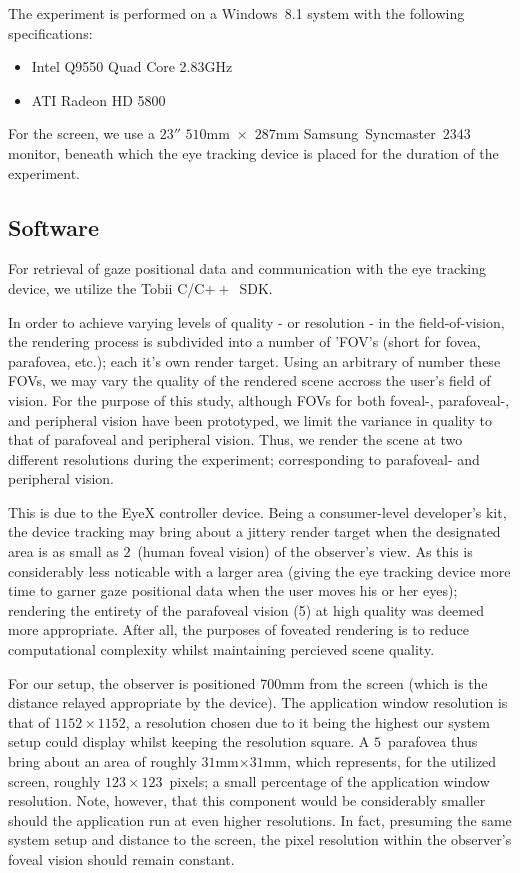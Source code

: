 The experiment is performed on a Windows~8.1 system with the following specifications:
\begin{itemize}
\setlength\itemsep{0em}
\item Intel Q9550 Quad Core 2.83GHz
\item ATI Radeon HD 5800
\end{itemize}

For the screen, we use a $23''$ $510$mm~$\times$~$287$mm Samsung~Syncmaster~$2343$ monitor, beneath which the eye tracking device is placed for the duration of the experiment.

\subsection{Software}
For retrieval of gaze positional data and communication with the eye tracking device, we utilize the Tobii C/C$++$~SDK.

In order to achieve varying levels of quality - or resolution - in the field-of-vision, the rendering process is subdivided into a number of 'FOV's (short for fovea, parafovea, etc.); each it's own render target.
Using an arbitrary of number these FOVs, we may vary the quality of the rendered scene accross the user's field of vision.
For the purpose of this study, although FOVs for both foveal-, parafoveal-, and peripheral vision have been prototyped, we limit the variance in quality to that of parafoveal and peripheral vision.
Thus, we render the scene at two different resolutions during the experiment; corresponding to parafoveal- and peripheral vision.

This is due to the EyeX controller device.
Being a consumer-level developer's kit, the device tracking may bring about a jittery render target when the designated area is as small as $2$\degree\ (human foveal vision) of the observer's view.
As this is considerably less noticable with a larger area (giving the eye tracking device more time to garner gaze positional data when the user moves his or her eyes); rendering the entirety of the parafoveal vision (5\degree ) at high quality was deemed more appropriate.
After all, the purposes of foveated rendering is to reduce computational complexity whilst maintaining percieved scene quality.

For our setup, the observer is positioned 700mm from the screen (which is the distance relayed appropriate by the device).
The application window resolution is that of $1152\times 1152$, a resolution chosen due to it being the highest our system setup could display whilst keeping the resolution square.
A $5$\degree\ parafovea thus bring about an area of roughly $31$mm$\times $$31$mm, which represents, for the utilized screen, roughly $123\times 123$~pixels; a small percentage of the application window resolution.
Note, however, that this component would be considerably smaller should the application run at even higher resolutions.
In fact, presuming the same system setup and distance to the screen, the pixel resolution within the observer's foveal vision should remain constant.

